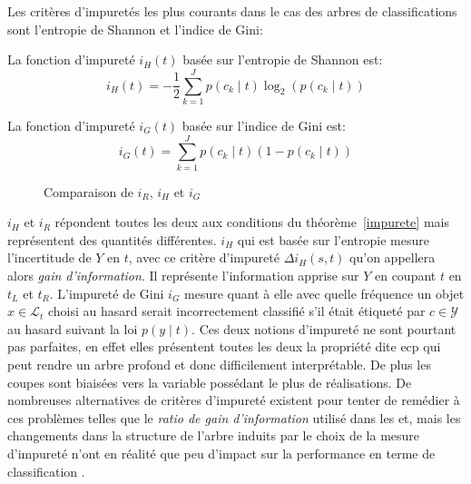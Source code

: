 Les critères d'impuretés les plus courants dans le cas des arbres de classifications sont l'entropie de Shannon et l'indice de Gini:
\begin{definition}
    La fonction d'impureté $i_H (t)$ basée sur l'entropie de Shannon \citep{Shannon1957} est:
    \begin{equation*}
        i_H (t) = - \frac{1}{2} \sum_{k=1}^J p(c_k \mid t) \log_2 \left( p(c_k \mid t ) \right)
    \end{equation*}
\end{definition}
\begin{definition}
    La fonction d'impureté $i_G (t)$ basée sur l'indice de Gini est:
    \begin{equation*}
        i_G (t) = \sum_{k=1}^J p\left(c_k \mid t \right) \left( 1-p(c_k \mid t) \right)
    \end{equation*}
\end{definition}

\begin{figure}[htbp]
    \centering
    \caption{Comparaison de $i_R$, $i_H$ et $i_G$}
\end{figure}

$i_H$ et $i_R$ répondent toutes les deux aux conditions du théorème~\ref{impurete} mais représentent des quantités différentes. $i_H$ qui est basée sur l'entropie mesure l'incertitude de $Y$ en $t$, avec ce critère d'impureté $\Delta i_H (s,t)$ qu'on appellera alors \emph{gain d'information}. Il représente l'information apprise sur $Y$ en coupant $t$ en $t_L$ et $t_R$. L'impureté de Gini $i_G$ mesure quant à elle avec quelle fréquence un objet $x \in \mathcal{L}_t$ choisi au hasard serait incorrectement classifié s'il était étiqueté par $c \in \mathcal{Y}$ au hasard suivant la loi $p(y \mid t)$. Ces deux notions d'impureté ne sont pourtant pas parfaites, en effet elles présentent toutes les deux la propriété dite \ac{ecp} qui peut rendre un arbre profond et donc difficilement interprétable. De plus les coupes sont biaisées vers la variable possédant le plus de réalisations. De nombreuses alternatives de critères d'impureté existent pour tenter de remédier à ces problèmes telles que le \emph{ratio de gain d'information} utilisé dans les \ac{et}, mais les changements dans la structure de l'arbre induits par le choix de la mesure d'impureté n'ont en réalité que peu d'impact sur la performance en terme de classification \citep{Louppe2014}.

